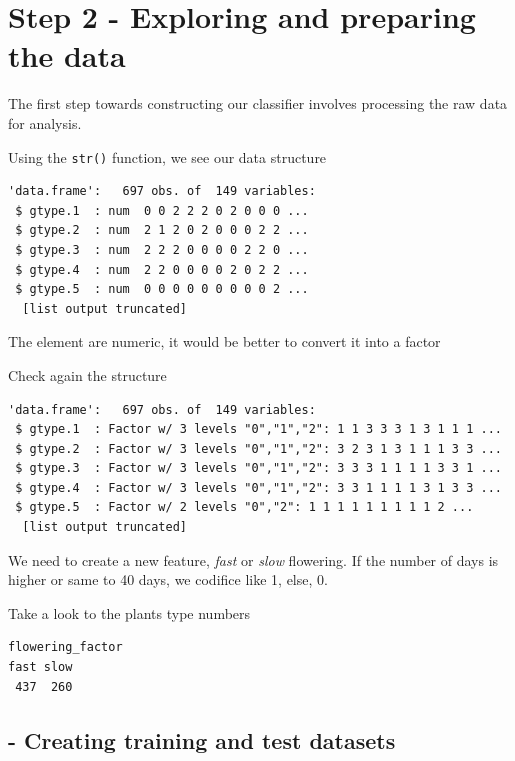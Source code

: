 \documentclass[
]{article}
\begin{document}
\hypertarget{step-2---exploring-and-preparing-the-data}{%
\section{Step 2 - Exploring and preparing the
data}\label{step-2---exploring-and-preparing-the-data}}

The first step towards constructing our classifier involves processing
the raw data for analysis.

Using the \texttt{str()} function, we see our data structure

\begin{verbatim}
'data.frame':   697 obs. of  149 variables:
 $ gtype.1  : num  0 0 2 2 2 0 2 0 0 0 ...
 $ gtype.2  : num  2 1 2 0 2 0 0 0 2 2 ...
 $ gtype.3  : num  2 2 2 0 0 0 0 2 2 0 ...
 $ gtype.4  : num  2 2 0 0 0 0 2 0 2 2 ...
 $ gtype.5  : num  0 0 0 0 0 0 0 0 0 2 ...
  [list output truncated]
\end{verbatim}

The element are numeric, it would be better to convert it into a factor

Check again the structure

\begin{verbatim}
'data.frame':   697 obs. of  149 variables:
 $ gtype.1  : Factor w/ 3 levels "0","1","2": 1 1 3 3 3 1 3 1 1 1 ...
 $ gtype.2  : Factor w/ 3 levels "0","1","2": 3 2 3 1 3 1 1 1 3 3 ...
 $ gtype.3  : Factor w/ 3 levels "0","1","2": 3 3 3 1 1 1 1 3 3 1 ...
 $ gtype.4  : Factor w/ 3 levels "0","1","2": 3 3 1 1 1 1 3 1 3 3 ...
 $ gtype.5  : Factor w/ 2 levels "0","2": 1 1 1 1 1 1 1 1 1 2 ...
  [list output truncated]
\end{verbatim}

We need to create a new feature, \emph{fast} or \emph{slow} flowering.
If the number of days is higher or same to 40 days, we codifice like 1,
else, 0.

Take a look to the plants type numbers

\begin{verbatim}
flowering_factor
fast slow 
 437  260 
\end{verbatim}

\hypertarget{creating-training-and-test-datasets}{%
\subsection{- Creating training and test
datasets}\label{creating-training-and-test-datasets}}
\end{document}
